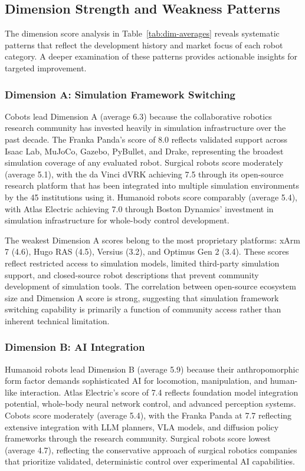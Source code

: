 \subsection{Dimension Strength and Weakness Patterns}
\label{subsec:dimension-patterns}

The dimension score analysis in Table~\ref{tab:dim-averages} reveals
systematic patterns that reflect the development history and market focus of
each robot category. A deeper examination of these patterns provides actionable
insights for targeted improvement.

\subsubsection{Dimension A: Simulation Framework Switching}

Cobots lead Dimension A (average 6.3) because the collaborative robotics
research community has invested heavily in simulation infrastructure over the
past decade. The Franka Panda's score of 8.0 reflects validated support across
Isaac Lab, MuJoCo, Gazebo, PyBullet, and Drake, representing the broadest
simulation coverage of any evaluated robot. Surgical robots score moderately
(average 5.1), with the da Vinci dVRK achieving 7.5 through its open-source
research platform that has been integrated into multiple simulation
environments by the 45 institutions using it. Humanoid robots score comparably
(average 5.4), with Atlas Electric achieving 7.0 through Boston Dynamics'
investment in simulation infrastructure for whole-body control development.

The weakest Dimension A scores belong to the most proprietary platforms: xArm 7
(4.6), Hugo RAS (4.5), Versius (3.2), and Optimus Gen 2 (3.4). These scores
reflect restricted access to simulation models, limited third-party simulation
support, and closed-source robot descriptions that prevent community
development of simulation tools. The correlation between open-source ecosystem
size and Dimension A score is strong, suggesting that simulation framework
switching capability is primarily a function of community access rather than
inherent technical limitation.

\subsubsection{Dimension B: AI Integration}

Humanoid robots lead Dimension B (average 5.9) because their anthropomorphic
form factor demands sophisticated AI for locomotion, manipulation, and
human-like interaction. Atlas Electric's score of 7.4 reflects foundation model
integration potential, whole-body neural network control, and advanced
perception systems. Cobots score moderately (average 5.4), with the Franka
Panda at 7.7 reflecting extensive integration with LLM planners, VLA models,
and diffusion policy frameworks through the research community. Surgical robots
score lowest (average 4.7), reflecting the conservative approach of surgical
robotics companies that prioritize validated, deterministic control over
experimental AI capabilities.


